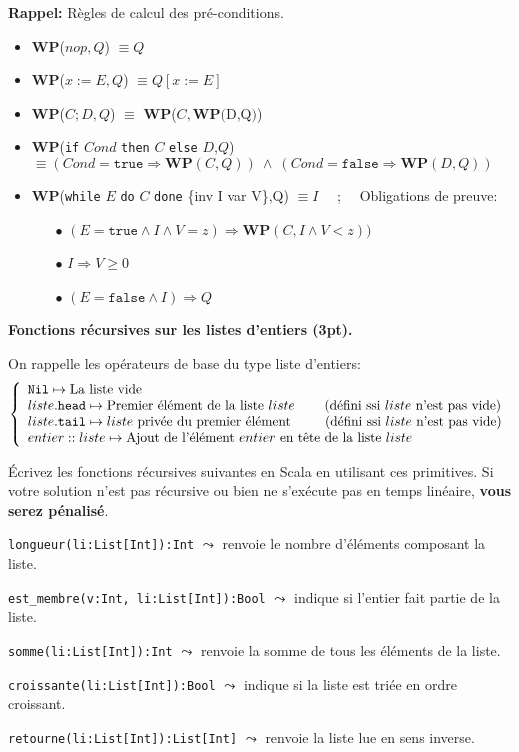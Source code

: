 \documentclass[10pt]{article}\usepackage[correction,nu]{esial}
\newcommand{\WP}[1]{\textbf{WP}($#1$)}
\begin{document}
\medskip\noindent\textbf{Rappel:} Règles de calcul des pré-conditions.

\begin{itemize}
\item \WP{nop, Q}  $\equiv Q$
\item \WP{x:=E, Q} $\equiv Q[x:=E]$
\item \WP{C;D, Q}  $\equiv$ \WP{C, \WP{D,Q}}
\item \textbf{WP}(\texttt{if} $Cond$ \texttt{then} $C$ \texttt{else} $D$,$Q$)
  $\equiv (Cond=\mathtt{true}\Rightarrow \mathbf{WP}(C,Q))~\wedge~
          (Cond=\mathtt{false}\Rightarrow \mathbf{WP}(D,Q))$
\item \textbf{WP}(\texttt{while} $E$ \texttt{do} $C$ \texttt{done} \{inv I var
  V\},Q)  $\equiv I$ ~~;~~  Obligations de preuve:
  \begin{enumerate}
  \item[$\bullet$] $(E=\mathtt{true}\wedge I\wedge V=z) \Rightarrow
    \mathbf{WP}(C,I\wedge V<z))$
  \item[$\bullet$] $I\Rightarrow V\geq 0$
  \item[$\bullet$] $(E=\mathtt{false}\wedge I) \Rightarrow Q$
  \end{enumerate}
\end{itemize}

\bigskip
\Exercice \textbf{Fonctions récursives sur les listes d'entiers (3pt).}

On rappelle les opérateurs de base du type liste d'entiers:
$$\left\{
\begin{array}{l}
  \mathtt{Nil}  \mapsto \text{La liste vide}\\
  liste\mathtt{.head} \mapsto \text{Premier élément de la liste } liste
    \;\;\;\;\;\;\;\;\text{(défini ssi } liste \text{ n'est pas vide)}\\
  liste\mathtt{.tail} \mapsto liste \text{ privée du premier élément}
    \text{\hspace{9mm}(défini ssi } liste \text{ n'est pas vide)}\\
  entier \;\mathtt{::}\; liste \mapsto \text{Ajout de l'élément } entier 
    \text{ en tête de la liste } liste
\end{array}\right.
$$

Écrivez les fonctions récursives suivantes en Scala en utilisant ces primitives. 
Si votre solution n'est pas récursive ou bien ne s'exécute pas en temps linéaire,
\textbf{vous serez pénalisé}.

\Question %
\texttt{longueur(li:List[Int]):Int} $\leadsto$ 
renvoie le nombre d'éléments composant la liste.

\Question %
\texttt{est\_membre(v:Int, li:List[Int]):Bool} $\leadsto$ 
indique si l'entier fait partie de la liste.

\Question %
\texttt{somme(li:List[Int]):Int} $\leadsto$ 
renvoie la somme de tous les éléments de la liste.

\Question %
\texttt{croissante(li:List[Int]):Bool} $\leadsto$
indique si la liste est triée en ordre croissant.

\Question %
\texttt{retourne(li:List[Int]):List[Int]} $\leadsto$
renvoie la liste lue en sens inverse.
\end{document}
